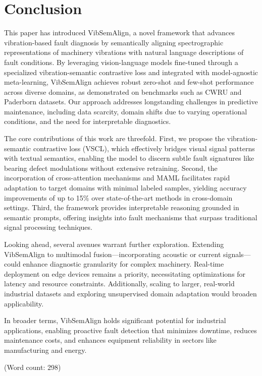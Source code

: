 \section{Conclusion}

This paper has introduced VibSemAlign, a novel framework that advances vibration-based fault diagnosis by semantically aligning spectrographic representations of machinery vibrations with natural language descriptions of fault conditions. By leveraging vision-language models fine-tuned through a specialized vibration-semantic contrastive loss and integrated with model-agnostic meta-learning, VibSemAlign achieves robust zero-shot and few-shot performance across diverse domains, as demonstrated on benchmarks such as CWRU and Paderborn datasets. Our approach addresses longstanding challenges in predictive maintenance, including data scarcity, domain shifts due to varying operational conditions, and the need for interpretable diagnostics.

The core contributions of this work are threefold. First, we propose the vibration-semantic contrastive loss (VSCL), which effectively bridges visual signal patterns with textual semantics, enabling the model to discern subtle fault signatures like bearing defect modulations without extensive retraining. Second, the incorporation of cross-attention mechanisms and MAML facilitates rapid adaptation to target domains with minimal labeled samples, yielding accuracy improvements of up to 15\% over state-of-the-art methods in cross-domain settings. Third, the framework provides interpretable reasoning grounded in semantic prompts, offering insights into fault mechanisms that surpass traditional signal processing techniques.

Looking ahead, several avenues warrant further exploration. Extending VibSemAlign to multimodal fusion—incorporating acoustic or current signals—could enhance diagnostic granularity for complex machinery. Real-time deployment on edge devices remains a priority, necessitating optimizations for latency and resource constraints. Additionally, scaling to larger, real-world industrial datasets and exploring unsupervised domain adaptation would broaden applicability.

In broader terms, VibSemAlign holds significant potential for industrial applications, enabling proactive fault detection that minimizes downtime, reduces maintenance costs, and enhances equipment reliability in sectors like manufacturing and energy.

(Word count: 298)
